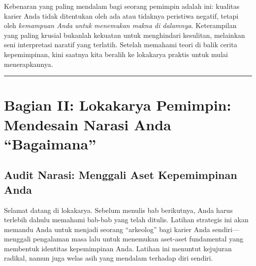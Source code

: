 \documentclass[
  letterpaper,
  DIV=11,
  numbers=noendperiod]{scrreprt}
\begin{document}
Kebenaran yang paling mendalam bagi seorang pemimpin adalah ini:
kualitas karier Anda tidak ditentukan oleh ada atau tidaknya peristiwa
negatif, tetapi oleh \emph{kemampuan Anda untuk menemukan makna di
dalamnya}. Keterampilan yang paling krusial bukanlah kekuatan untuk
menghindari kesulitan, melainkan seni interpretasi naratif yang
terlatih. Setelah memahami teori di balik cerita kepemimpinan, kini
saatnya kita beralih ke lokakarya praktis untuk mulai menerapkannya.

\begin{center}\rule{0.5\linewidth}{0.5pt}\end{center}

\section{Bagian II: Lokakarya Pemimpin: Mendesain Narasi Anda
``Bagaimana''}\label{bagian-ii-lokakarya-pemimpin-mendesain-narasi-anda-bagaimana}

\subsection{Audit Narasi: Menggali Aset Kepemimpinan
Anda}\label{audit-narasi-menggali-aset-kepemimpinan-anda}

Selamat datang di lokakarya. Sebelum menulis bab berikutnya, Anda harus
terlebih dahulu memahami bab-bab yang telah ditulis. Latihan strategis
ini akan memandu Anda untuk menjadi seorang ``arkeolog'' bagi karier
Anda sendiri---menggali pengalaman masa lalu untuk menemukan aset-aset
fundamental yang membentuk identitas kepemimpinan Anda. Latihan ini
menuntut kejujuran radikal, namun juga welas asih yang mendalam terhadap
diri sendiri.
\end{document}
